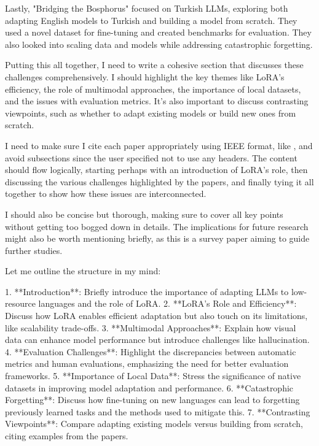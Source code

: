 \documentclass[conference]{IEEEtran}
\begin{document}
Lastly, "Bridging the Bosphorus" focused on Turkish LLMs, exploring both adapting English models to Turkish and building a model from scratch. They used a novel dataset for fine-tuning and created benchmarks for evaluation. They also looked into scaling data and models while addressing catastrophic forgetting.

Putting this all together, I need to write a cohesive section that discusses these challenges comprehensively. I should highlight the key themes like LoRA's efficiency, the role of multimodal approaches, the importance of local datasets, and the issues with evaluation metrics. It’s also important to discuss contrasting viewpoints, such as whether to adapt existing models or build new ones from scratch.

I need to make sure I cite each paper appropriately using IEEE format, like \cite{b1}, and avoid subsections since the user specified not to use any headers. The content should flow logically, starting perhaps with an introduction of LoRA's role, then discussing the various challenges highlighted by the papers, and finally tying it all together to show how these issues are interconnected.

I should also be concise but thorough, making sure to cover all key points without getting too bogged down in details. The implications for future research might also be worth mentioning briefly, as this is a survey paper aiming to guide further studies.

Let me outline the structure in my mind:

1. **Introduction**: Briefly introduce the importance of adapting LLMs to low-resource languages and the role of LoRA.
2. **LoRA's Role and Efficiency**: Discuss how LoRA enables efficient adaptation but also touch on its limitations, like scalability trade-offs.
3. **Multimodal Approaches**: Explain how visual data can enhance model performance but introduce challenges like hallucination.
4. **Evaluation Challenges**: Highlight the discrepancies between automatic metrics and human evaluations, emphasizing the need for better evaluation frameworks.
5. **Importance of Local Data**: Stress the significance of native datasets in improving model adaptation and performance.
6. **Catastrophic Forgetting**: Discuss how fine-tuning on new languages can lead to forgetting previously learned tasks and the methods used to mitigate this.
7. **Contrasting Viewpoints**: Compare adapting existing models versus building from scratch, citing examples from the papers.
\end{document}
